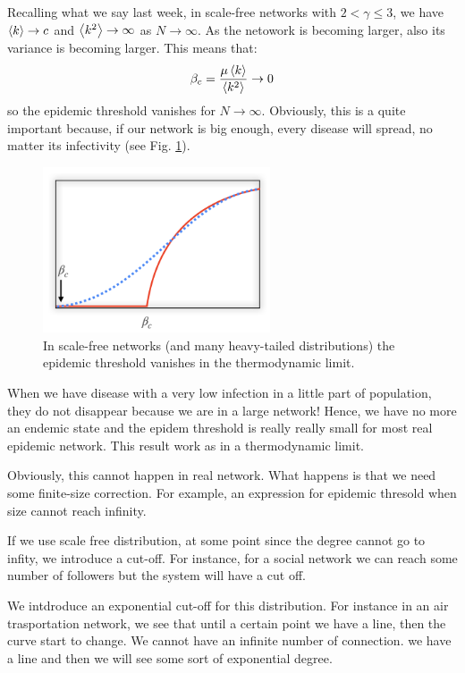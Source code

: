 \documentclass[../main/main.tex]{subfiles}
\begin{document}
Recalling what we say last week, in scale-free networks with \( 2 < \gamma \le 3  \), we have \( \expval{k} \rightarrow c  \) and \( \expval{k^2}  \rightarrow \infty  \) as \( N \rightarrow \infty  \).
As the netowork is becoming larger, also its variance is becoming larger. This means that:
\begin{equation*}
  \beta _c = \frac{\mu \expval{k} }{\expval{k^2} } \rightarrow 0
\end{equation*}
so the epidemic threshold vanishes for \( N \rightarrow \infty  \).
Obviously, this is a quite important because, if our network is big enough, every disease will spread, no matter its infectivity (see Fig. \ref{fig:07_1}).

\begin{figure}[h!]
\centering
\includegraphics[width=0.6\textwidth]{../lessons/image/07/1.png}
\caption{\label{fig:07_1} In scale-free networks (and many heavy-tailed distributions) the epidemic threshold vanishes in the thermodynamic limit.}
\end{figure}

When we have disease with a very low infection in a little part of population, they do not disappear because we are in a large network!
Hence, we have no more an endemic state and the epidem threshold is really really small for most real epidemic network.
This result work as in a thermodynamic limit.

Obviously, this cannot happen in real network. What happens is that we need some finite-size correction. For example, an expression for epidemic thresold when size cannot reach infinity.

If we use scale free distribution, at some point since the degree cannot go to infity, we introduce a cut-off. For instance, for a social network we can reach some number of followers but the system will have a cut off.

 We intdroduce an exponential cut-off for this distribution. For instance in an air trasportation network, we see that until a certain point we have a line, then the curve start to change. We cannot have an infinite number of connection. we have a line and then we will see some sort of exponential degree.
\end{document}

